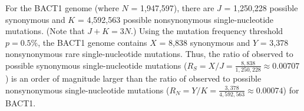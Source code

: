 For the BACT1 genome
(where $N$ = 1,947,597),
there are $J$ = 1,250,228 possible synonymous and
$K$ = 4,592,563 possible nonsynonymous single-nucleotide mutations.
(Note that $J + K = 3N$.)
%
Using the mutation frequency threshold $p = 0.5\%$,
the BACT1 genome contains
$X$ = 8,838 synonymous and
$Y$ = 3,378 nonsynonymous rare single-nucleotide mutations.
%
Thus, the ratio of observed to possible synonymous single-nucleotide mutations
($R_S = X / J = \frac{8,838}{1,250,228}
\approx 0.00707$)
is an order of magnitude larger than the ratio of observed to possible nonsynonymous single-nucleotide mutations
($R_N = Y / K = \frac{3,378}{4,592,563}
\approx 0.00074$)
for BACT1.
\endinput